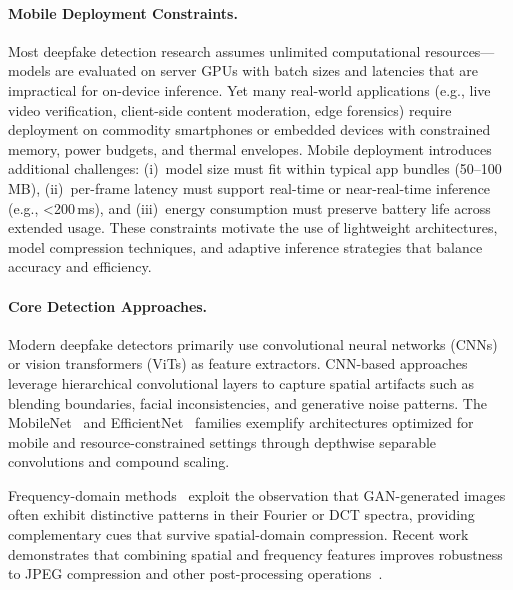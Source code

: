 \paragraph{Mobile Deployment Constraints.}
Most deepfake detection research assumes unlimited computational resources—models are evaluated on server GPUs with batch sizes and latencies that are impractical for on\hyp device inference. Yet many real\hyp world applications (e.g., live video verification, client\hyp side content moderation, edge forensics) require deployment on commodity smartphones or embedded devices with constrained memory, power budgets, and thermal envelopes. Mobile deployment introduces additional challenges: (i)~model size must fit within typical app bundles (50–100\,MB), (ii)~per\hyp frame latency must support real\hyp time or near\hyp real\hyp time inference (e.g., \textless200\,ms), and (iii)~energy consumption must preserve battery life across extended usage. These constraints motivate the use of lightweight architectures, model compression techniques, and adaptive inference strategies that balance accuracy and efficiency.

\paragraph{Core Detection Approaches.}
Modern deepfake detectors primarily use convolutional neural networks (CNNs) or vision transformers (ViTs) as feature extractors. CNN\hyp based approaches~\cite{rossler2019faceforensicspp,tan2019efficientnet,efficientnetv2} leverage hierarchical convolutional layers to capture spatial artifacts such as blending boundaries, facial inconsistencies, and generative noise patterns. The MobileNet~\cite{howard2017mobilenetv1,sandler2018mobilenetv2,howard2019mobilenetv3,mobilenetv4} and EfficientNet~\cite{tan2019efficientnet,efficientnetv2} families exemplify architectures optimized for mobile and resource\hyp constrained settings through depthwise separable convolutions and compound scaling.

Frequency\hyp domain methods~\cite{durall2020watch,qian2020thinkingfrequency,luo2024freqnet} exploit the observation that GAN\hyp generated images often exhibit distinctive patterns in their Fourier or DCT spectra, providing complementary cues that survive spatial\hyp domain compression. Recent work demonstrates that combining spatial and frequency features improves robustness to JPEG compression and other post\hyp processing operations~\cite{wang2022afd,zhang2024frequency_dct}.

